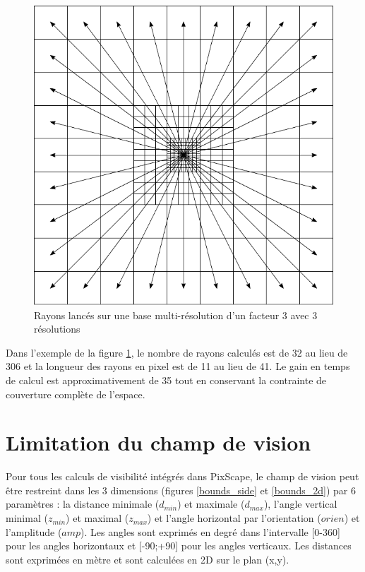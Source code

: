 \documentclass{report}
\begin{document}
\begin{figure}[H]
	\includegraphics{img/grid_multi.pdf} 
	\caption{Rayons lancés sur une base multi-résolution d'un facteur 3 avec 3 résolutions}
	\label{grid_multi}
\end{figure}

Dans l'exemple de la figure \ref{grid_multi}, le nombre de rayons calculés est de 32 au lieu de 306 et la longueur des rayons en pixel est de 11 au lieu de 41. Le gain en temps de calcul est approximativement de 35 tout en conservant la contrainte de couverture complète de l'espace.


\section{Limitation du champ de vision}
\label{bounds}
Pour tous les calculs de visibilité intégrés dans PixScape, le champ de vision peut être restreint dans les 3 dimensions (figures \ref{bounds_side} et \ref{bounds_2d}) par 6 paramètres : la distance minimale ($d_{min}$) et maximale ($d_{max}$), l'angle vertical minimal ($z_{min}$) et maximal ($z_{max}$) et l'angle horizontal par l'orientation ($orien$) et l'amplitude ($amp$). Les angles sont exprimés en degré dans l'intervalle [0-360] pour les angles horizontaux et [-90;+90] pour les angles verticaux. Les distances sont exprimées en mètre et sont calculées en 2D sur le plan (x,y). 
\end{document}
